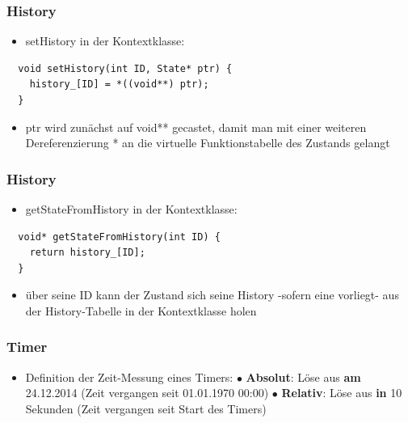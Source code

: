\documentclass{beamer}
\begin{document}
\begin{frame}[fragile]
 \frametitle{History}
 \begin{itemize}
  \item setHistory in der Kontextklasse:
 \end{itemize}
 \begin{lstlisting}
  void setHistory(int ID, State* ptr) {
    history_[ID] = *((void**) ptr);
  }
 \end{lstlisting}
 \begin{itemize}
  \item ptr wird zun\"achst auf void** gecastet, damit man mit einer weiteren Dereferenzierung * an die virtuelle Funktionstabelle des Zustands gelangt
 \end{itemize}
\end{frame}

\begin{frame}[fragile]
 \frametitle{History}
 \begin{itemize}
  \item getStateFromHistory in der Kontextklasse:
 \end{itemize}
 \begin{lstlisting}
  void* getStateFromHistory(int ID) {
    return history_[ID];
  }
 \end{lstlisting}
 \begin{itemize}
  \item \"uber seine ID kann der Zustand sich seine History -sofern eine vorliegt- aus der History-Tabelle in der Kontextklasse holen
 \end{itemize}
\end{frame}

\begin{frame}[fragile]
 \frametitle{Timer}
 \begin{itemize}
  \item Definition der Zeit-Messung eines Timers:\newline\newline
  $\bullet$ \textbf{Absolut}: L\"ose aus \textbf{am} 24.12.2014\newline
  (Zeit vergangen seit 01.01.1970 00:00)\newline\newline
  $\bullet$ \textbf{Relativ}: L\"ose aus \textbf{in} 10 Sekunden\newline
  (Zeit vergangen seit Start des Timers)
 \end{itemize}
\end{frame}
\end{document}

